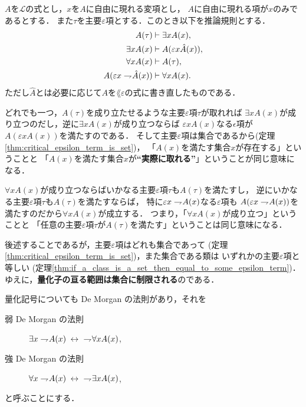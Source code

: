 	\begin{screen}
		\begin{logicalaxm}[量化記号に関する規則]
		\label{logicalaxm:rules_of_quantifiers}
			$A$を$\mathcal{L}$の式とし，$x$を$A$に自由に現れる変項とし，
			$A$に自由に現れる項が$x$のみであるとする．
			また$\tau$を主要$\varepsilon$項とする．このとき以下を推論規則とする．
			\begin{align}
				A(\tau) &\vdash \exists x A(x), \\
				\exists x A(x) &\vdash A(\varepsilon x \hat{A}(x)), \\
				\forall x A(x) &\vdash A(\tau), \\
				A(\varepsilon x \rightharpoondown\hspace{-0.25em} \hat{A}(x)) &\vdash \forall x A(x).
			\end{align}
			ただし$\hat{A}$とは必要に応じて$A$を$\lang{\varepsilon}$の式に書き直したものである．
		\end{logicalaxm}
	\end{screen}
	
	どれでも一つ，$A(\tau)$を成り立たせるような主要$\varepsilon$項$\tau$が取れれば
	$\exists x A(x)$が成り立つのだし，逆に$\exists x A(x)$が成り立つならば
	$\varepsilon x A(x)$なる$\epsilon$項が$A(\varepsilon x A(x))$を満たすのである．
	そして主要$\varepsilon$項は集合であるから(定理\ref{thm:critical_epsilon_term_is_set})，
	「$A(x)$を満たす集合$x$が存在する」ということと
	「$A(x)$を満たす集合$x$が{\bf ``実際に取れる''}」ということが同じ意味になる．
	
	$\forall x A(x)$が成り立つならばいかなる主要$\varepsilon$項$\tau$も$A(\tau)$を満たすし，
	逆にいかなる主要$\varepsilon$項$\tau$も$A(\tau)$を満たすならば，
	特に$\varepsilon x \rightharpoondown\hspace{-0.25em} A(x)$なる$\varepsilon$項も
	$A(\varepsilon x \rightharpoondown\hspace{-0.25em} A(x))$を満たすのだから$\forall x A(x)$が成立する．
	つまり，「$\forall x A(x)$が成り立つ」ということと
	「任意の主要$\varepsilon$項$\tau$が$A(\tau)$を満たす」ということは同じ意味になる．
	
	後述することであるが，主要$\varepsilon$項はどれも集合であって
	(定理\ref{thm:critical_epsilon_term_is_set})，また集合である類は
	いずれかの主要$\varepsilon$項と等しい
	(定理\ref{thm:if_a_class_is_a_set_then_equal_to_some_epsilon_term})．
	ゆえに，{\bf 量化子の亘る範囲は集合に制限される}のである．
	
	量化記号についても De Morgan の法則があり，それを
	\begin{description}
		\item[弱 De Morgan の法則] $\exists x \negation A(x) \lrarrow\ \negation \forall x A(x)$,
		\item[強 De Morgan の法則] $\forall x \negation A(x) \lrarrow\ \negation \exists x A(x)$,
	\end{description}
	と呼ぶことにする．
	
